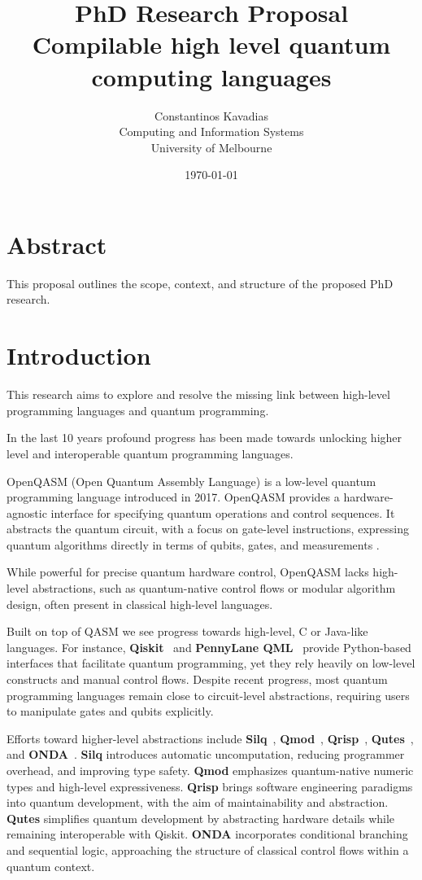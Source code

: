 \documentclass[journal,onecolumn, compsoc]{IEEEtran}
\title{PhD Research Proposal\\\large{Compilable high level quantum computing languages}}
\author{Constantinos Kavadias\\Computing and Information Systems\\University of Melbourne}
\date{\today}
\begin{document}
\maketitle

\newpage
\tableofcontents
\newpage

\section*{Abstract}
This proposal outlines the scope, context, and structure of the proposed PhD research.

\section{Introduction}
This research aims to explore and resolve the missing link between high-level programming languages and quantum programming.

In the last 10 years profound progress has been made towards unlocking higher level and interoperable quantum programming languages.

OpenQASM (Open Quantum Assembly Language) is a low-level quantum programming language introduced in 2017. OpenQASM provides a hardware-agnostic interface for specifying quantum operations and control sequences. It abstracts the quantum circuit, with a focus on gate-level instructions, expressing quantum algorithms directly in terms of qubits, gates, and measurements \cite{cross2017open}.

While powerful for precise quantum hardware control, OpenQASM lacks high-level abstractions, such as quantum-native control flows or modular algorithm design, often present in classical high-level languages.

Built on top of QASM we see progress towards high-level, C or Java-like languages. For instance, \textbf{Qiskit}~\cite{qiskit} and \textbf{PennyLane QML}~\cite{pennylane} provide Python-based interfaces that facilitate quantum programming, yet they rely heavily on low-level constructs and manual control flows.
Despite recent progress, most quantum programming languages remain close to circuit-level abstractions, requiring users to manipulate gates and qubits explicitly.

Efforts toward higher-level abstractions include \textbf{Silq}~\cite{silq2024}, \textbf{Qmod}~\cite{qmod2025}, \textbf{Qrisp}~\cite{qrisp2024}, \textbf{Qutes}~\cite{qutes2025}, and \textbf{ONDA}~\cite{onda2024}. \textbf{Silq} introduces automatic uncomputation, reducing programmer overhead, and improving type safety. \textbf{Qmod} emphasizes quantum-native numeric types and high-level expressiveness. \textbf{Qrisp} brings software engineering paradigms into quantum development, with the aim of maintainability and abstraction. \textbf{Qutes} simplifies quantum development by abstracting hardware details while remaining interoperable with Qiskit. \textbf{ONDA} incorporates conditional branching and sequential logic, approaching the structure of classical control flows within a quantum context.
\end{document}
